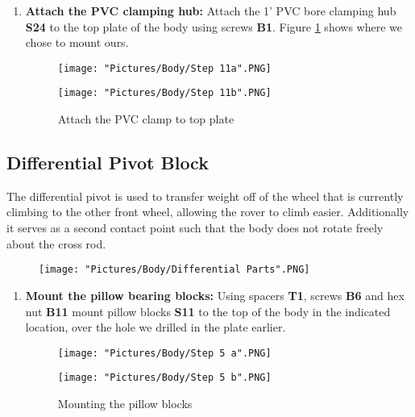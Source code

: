 \documentclass[12pt]{article}
\begin{document}
\begin{enumerate}
\item \textbf{Attach the PVC clamping hub:} Attach the 1' PVC bore clamping hub \textbf{S24} to the top plate of the body using screws \textbf{B1}. Figure \ref{pvc to top plate} shows where we chose to mount ours. 

\begin{figure}[H]
  \centering
  \begin{minipage}[b]{0.40\textwidth}
    \texttt{[image: "Pictures/Body/Step 11a".PNG]}
  \end{minipage}
  \hfill
  \begin{minipage}[b]{0.50\textwidth}
    \texttt{[image: "Pictures/Body/Step 11b".PNG]}
  \end{minipage}
  \caption{Attach the PVC clamp to top plate}
	\label{pvc to top plate}
\end{figure}

\end{enumerate}


\subsection{Differential Pivot Block}
The differential pivot is used to transfer weight off of the wheel that is currently climbing to the other front wheel, allowing the rover to climb easier. Additionally it serves as a second contact point such that the body does not rotate freely about the cross rod.

\begin{figure}[H]
	\centering
	\texttt{[image: "Pictures/Body/Differential Parts".PNG]}
\end{figure}

\begin{enumerate}
\item \textbf{Mount the pillow bearing blocks:} Using spacers \textbf{T1}, screws \textbf{B6} and hex nut \textbf{B11} mount pillow blocks \textbf{S11} to the top of the body in the indicated location, over the hole we drilled in the plate earlier.

\begin{figure}[H]
  \centering
  \begin{minipage}[b]{0.30\textwidth}
    \texttt{[image: "Pictures/Body/Step 5 a".PNG]}
  \end{minipage}
  \hfill
  \begin{minipage}[b]{0.55\textwidth}
    \texttt{[image: "Pictures/Body/Step 5 b".PNG]}
  \end{minipage}
  \caption{Mounting the pillow blocks}
\end{figure}


\end{enumerate}
\end{document}
